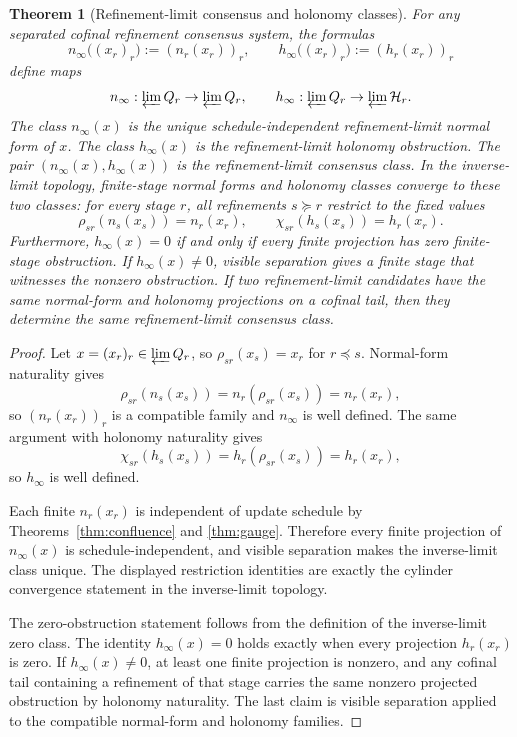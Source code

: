 \documentclass[11pt]{article}
\newtheorem{theorem}{Theorem}[section]
\theoremstyle{remark}
\theoremstyle{plain}
\begin{document}
\begin{theorem}[Refinement-limit consensus and holonomy classes]\label{thm:refinement-consensus}
For any separated cofinal refinement consensus system, the formulas
\[
n_\infty\bigl((x_r)_r\bigr):=(n_r(x_r))_r,
\qquad
h_\infty\bigl((x_r)_r\bigr):=(h_r(x_r))_r
\]
define maps
\[
n_\infty:\varprojlim Q_r\to\varprojlim Q_r,
\qquad
h_\infty:\varprojlim Q_r\to\varprojlim\mathcal H_r.
\]
The class \(n_\infty(x)\) is the unique schedule-independent refinement-limit normal form of
\(x\). The class \(h_\infty(x)\) is the refinement-limit holonomy obstruction. The pair
\((n_\infty(x),h_\infty(x))\) is the refinement-limit consensus class. In the inverse-limit
topology, finite-stage normal forms and holonomy classes converge to these two classes: for every
stage \(r\), all refinements \(s\succeq r\) restrict to the fixed values
\[
\rho_{sr}(n_s(x_s))=n_r(x_r),
\qquad
\chi_{sr}(h_s(x_s))=h_r(x_r).
\]
Furthermore, \(h_\infty(x)=0\) if and only if every finite projection has zero finite-stage
obstruction. If \(h_\infty(x)\ne0\), visible separation gives a finite stage that witnesses the
nonzero obstruction. If two refinement-limit candidates have the same normal-form and holonomy
projections on a cofinal tail, then they determine the same refinement-limit consensus class.
\end{theorem}

\begin{proof}
Let \(x=(x_r)_r\in\varprojlim Q_r\), so \(\rho_{sr}(x_s)=x_r\) for \(r\preceq s\). Normal-form
naturality gives
\[
\rho_{sr}(n_s(x_s))
=
n_r(\rho_{sr}(x_s))
=
n_r(x_r),
\]
so \((n_r(x_r))_r\) is a compatible family and \(n_\infty\) is well defined. The same argument
with holonomy naturality gives
\[
\chi_{sr}(h_s(x_s))
=
h_r(\rho_{sr}(x_s))
=
h_r(x_r),
\]
so \(h_\infty\) is well defined.

Each finite \(n_r(x_r)\) is independent of update schedule by Theorems~\ref{thm:confluence} and
\ref{thm:gauge}. Therefore every finite projection of \(n_\infty(x)\) is schedule-independent,
and visible separation makes the inverse-limit class unique. The displayed restriction identities
are exactly the cylinder convergence statement in the inverse-limit topology.

The zero-obstruction statement follows from the definition of the inverse-limit zero class. The
identity \(h_\infty(x)=0\) holds exactly when every projection \(h_r(x_r)\) is zero. If
\(h_\infty(x)\ne0\), at least one finite projection is nonzero, and any cofinal tail containing a
refinement of that stage carries the same nonzero projected obstruction by holonomy naturality.
The last claim is visible separation applied to the compatible normal-form and holonomy families.
\end{proof}
\end{document}
